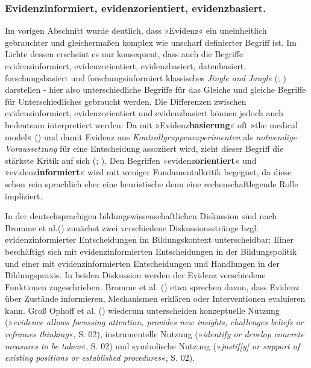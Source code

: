 \documentclass[
  jou,
  floatsintext,
  longtable,
  nolmodern,
  notxfonts,
  notimes,
  colorlinks=true,linkcolor=blue,citecolor=blue,urlcolor=blue]{apa7}
\begin{document}
\subsubsection{Evidenzinformiert, evidenzorientiert,
evidenzbasiert.}\label{evidenzinformiert-evidenzorientiert-evidenzbasiert.}

Im vorigen Abschnitt wurde deutlich, dass »Evidenz« ein uneinheitlich
gebrauchter und gleichermaßen komplex wie unscharf definierter Begriff
ist. Im Lichte dessen erscheint es nur konsequent, dass auch die
Begriffe evidenzinformiert, evidenzorientiert, evidenzbasiert,
datenbasiert, forschungsbasiert und forschungsinformiert klassisches
\emph{Jingle and Jangle} (; ) darstellen - hier
also unterschiedliche Begriffe für das Gleiche und gleiche Begriffe für
Unterschiedliches gebraucht werden. Die Differenzen zwischen
evidenzinformiert, evidenzorientiert und evidenzbasiert können jedoch
auch bedeutsam interpretiert werden: Da mit »Evidenz\textbf{basierung}«
oft »the medical model« () und
damit Evidenz aus \emph{Kontrollgruppenexperimenten} als
\emph{notwendige Voraussetzung} für eine Entscheidung assoziiert wird,
zieht dieser Begriff die stärkste Kritik auf sich
(;
). Den Begriffen
»evidenz\textbf{orientiert}« und »evidenz\textbf{informiert}« wird mit
weniger Fundamentalkritik begegnet, da diese schon rein sprachlich eher
eine heuristische denn eine rechenschaftlegende Rolle impliziert.

In der deutschsprachigen bildungswissenschaftlichen Diskussion sind nach
Bromme et al.() zunächst zwei
verschiedene Diskussionsstränge bzgl. evidenzinformierter Entscheidungen
im Bildungskontext unterscheidbar: Einer beschäftigt sich mit
evidenzinformierten Entscheidungen in der Bildungspolitik und einer mit
evidenzinformierten Entscheidungen und Handlungen in der Bildungspraxis.
In beiden Diskussion werden der Evidenz verschiedene Funktionen
zugeschrieben. Bromme et al. () etwa
sprechen davon, dass Evidenz über Zustände informieren, Mechanismen
erklären oder Interventionen evaluieren kann. Groß Ophoff et al.
() wiederum
unterscheiden konzeptuelle Nutzung (»\emph{evidence allows focussing
attention, provides new insights, challenges beliefs or reframes
thinking}«, S. 02), instrumentelle Nutzung (»\emph{identify or develop
concrete measures to be taken}«, S. 02) und symbolische Nutzung
(»\emph{justif{[}y{]} or support of existing positions or established
procedures}«, S. 02).
\end{document}
